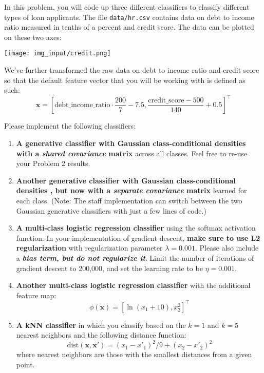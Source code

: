 \documentclass[submit]{../harvardml}
\begin{document}
\begin{problem}
In this problem, you will code up three different classifiers to classify different types of loan applicants. The file \verb|data/hr.csv| contains data on debt to income ratio measured in tenths of a percent and credit score. The data can be plotted on these two axes:
\begin{center}
  \texttt{[image: img\_input/credit.png]}
\end{center}
We've further transformed the raw data on debt to income ratio and credit score so that the default feature vector that you will be working with is defined as such:
\[\bm{x} = \left[\text{debt\_income\_ratio} \cdot \frac{200}{7}-7.5, \frac{\text{credit\_score}-500}{140}+0.5\right]^\top\]

\noindent Please implement the following classifiers:


\begin{enumerate}[label=\alph*)]

  \item \textbf{A generative classifier with Gaussian class-conditional
          densities with a \textit{shared covariance} matrix} across all classes.
        Feel free to re-use your Problem 2 results.

  \item \textbf{Another generative classifier with Gaussian class-conditional densities , but now
          with a \textit{separate covariance} matrix} learned for each class. (Note:
        The staff implementation can switch between the two Gaussian generative classifiers with just a
        few lines of code.)

  \item \textbf{A multi-class logistic regression classifier} using the softmax activation function. In your implementation of gradient descent, \textbf{make sure to use L2 regularization} with regularization parameter $\lambda = 0.001$. Please also include a \emph{\textbf{bias term, but do not regularize it}}. Limit the number of iterations of gradient descent to 200,000, and set the learning rate to be $\eta = 0.001$.

  \item \textbf{Another multi-class logistic regression classifier} with the additional feature map:
  $$\phi(\bm x) = [\ln (x_1+10), x_2^2]^\top$$

  \item \textbf{A kNN classifier} in which you classify based on the $k = 1$ and $k = 5$ nearest neighbors and the following distance function: 
  \[\text{dist}(\boldsymbol{x}, \boldsymbol{x}') = (x_1 - x'_1)^2/9 + (x_2 - x'_2)^2\]
        where nearest neighbors are those with the smallest distances from a given point.


\end{enumerate}
\end{problem}
\end{document}
